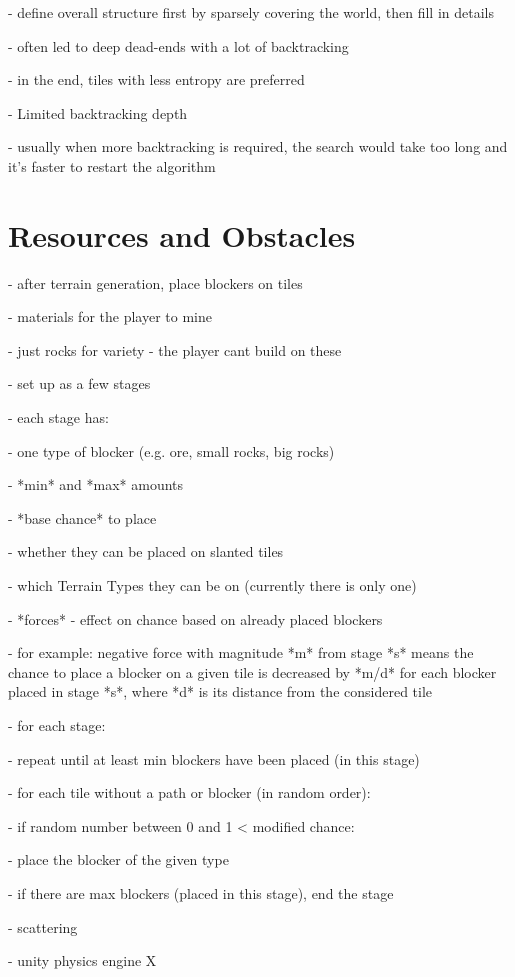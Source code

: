 - define overall structure first by sparsely covering the world, then fill in details

- often led to deep dead-ends with a lot of backtracking

- in the end, tiles with less entropy are preferred

- Limited backtracking depth

- usually when more backtracking is required, the search would take too long and it's faster to restart the algorithm

\section{Resources and Obstacles}

- after terrain generation, place blockers on tiles

- materials for the player to mine

- just rocks for variety - the player cant build on these

- set up as a few stages

- each stage has:

- one type of blocker (e.g. ore, small rocks, big rocks)

- *min* and *max* amounts

- *base chance* to place

- whether they can be placed on slanted tiles

- which Terrain Types they can be on (currently there is only one)

- *forces* - effect on chance based on already placed blockers

- for example: negative force with magnitude *m* from stage *s* means the chance to place a blocker on a given tile is decreased by *m/d*  for each blocker placed in stage *s*, where *d* is its distance from the considered tile

- for each stage:

- repeat until at least min blockers have been placed (in this stage)

- for each tile without a path or blocker (in random order):

- if random number between 0 and 1 < modified chance:

- place the blocker of the given type

- if there are max blockers (placed in this stage), end the stage

- scattering

- unity physics engine X

